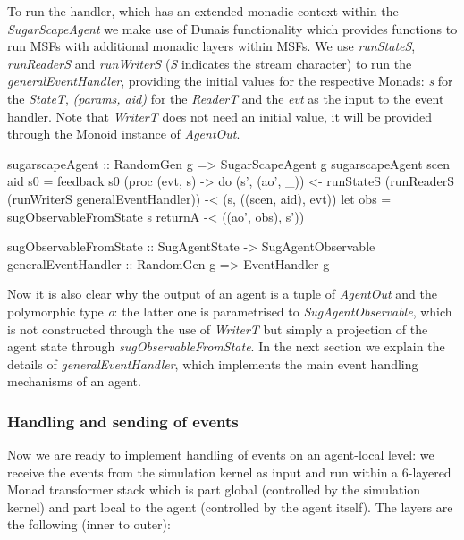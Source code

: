 To run the handler, which has an extended monadic context within the \textit{SugarScapeAgent} we make use of Dunais functionality which provides functions to run MSFs with additional monadic layers within MSFs. We use \textit{runStateS}, \textit{runReaderS} and \textit{runWriterS} (\textit{S} indicates the stream character) to run the \textit{generalEventHandler}, providing the initial values for the respective Monads: \textit{s} for the \textit{StateT}, \textit{(params, aid)} for the \textit{ReaderT} and the \textit{evt} as the input to the event handler. Note that \textit{WriterT} does not need an initial value, it will be provided through the Monoid instance of \textit{AgentOut}.

\begin{HaskellCode}
sugarscapeAgent :: RandomGen g => SugarScapeAgent g
sugarscapeAgent scen aid s0 = feedback s0 (proc (evt, s) -> do
  (s', (ao', _)) <- runStateS 
                      (runReaderS 
                        (runWriterS generalEventHandler)) -< (s, ((scen, aid), evt))
  let obs = sugObservableFromState s
  returnA -< ((ao', obs), s'))

sugObservableFromState :: SugAgentState -> SugAgentObservable
generalEventHandler :: RandomGen g => EventHandler g
\end{HaskellCode}

Now it is also clear why the output of an agent is a tuple of \textit{AgentOut} and the polymorphic type \textit{o}: the latter one is parametrised to \textit{SugAgentObservable}, which is not constructed through the use of \textit{WriterT} but simply a projection of the agent state through \textit{sugObservableFromState}. In the next section we explain the details of \textit{generalEventHandler}, which implements the main event handling mechanisms of an agent.

\subsubsection{Handling and sending of events}
Now we are ready to implement handling of events on an agent-local level: we receive the events from the simulation kernel as input and run within a 6-layered Monad transformer stack which is part global (controlled by the simulation kernel) and part local to the agent (controlled by the agent itself). The layers are the following (inner to outer):

